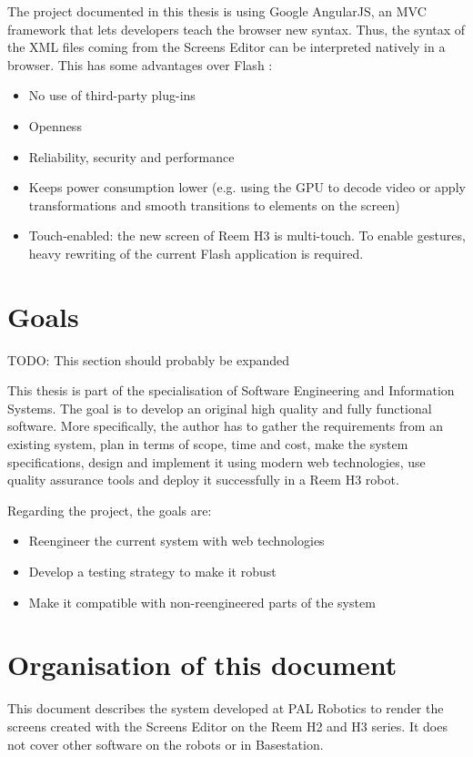 The project documented in this thesis is using Google AngularJS, an \ac{MVC} framework that lets developers teach the browser new syntax. 
Thus, the syntax of the \ac{XML} files coming from the Screens Editor can be interpreted natively in a browser. 
This has some advantages over Flash \cite{Jobs:ThoughtsOnFlash}:
\begin{itemize}
    \item No use of third-party plug-ins
    \item Openness
    \item Reliability, security and performance
    \item Keeps power consumption lower (e.g. using the GPU to decode video or apply transformations and smooth transitions to elements on the screen)
    \item Touch-enabled: the new screen of Reem H3 is multi-touch. To enable gestures, heavy rewriting of the current Flash application is required.
\end{itemize}


\section{Goals}
TODO: This section should probably be expanded

This thesis is part of the specialisation of Software Engineering and Information Systems. 
The goal is to develop an original high quality and fully functional software. 
More specifically, the author has to gather the requirements from an existing system, plan in terms of scope, time and cost, make the system specifications, design and implement it using modern web technologies, use quality assurance tools and deploy it successfully in a Reem H3 robot.

Regarding the project, the goals are:
\begin{itemize}
\item Reengineer the current system with web technologies
\item Develop a testing strategy to make it robust
\item Make it compatible with non-reengineered parts of the system
\end{itemize}

\section{Organisation of this document}
This document describes the system developed at PAL Robotics to render the screens created with the Screens Editor on the Reem H2 and H3 series.
It does not cover other software on the robots or in Basestation.

